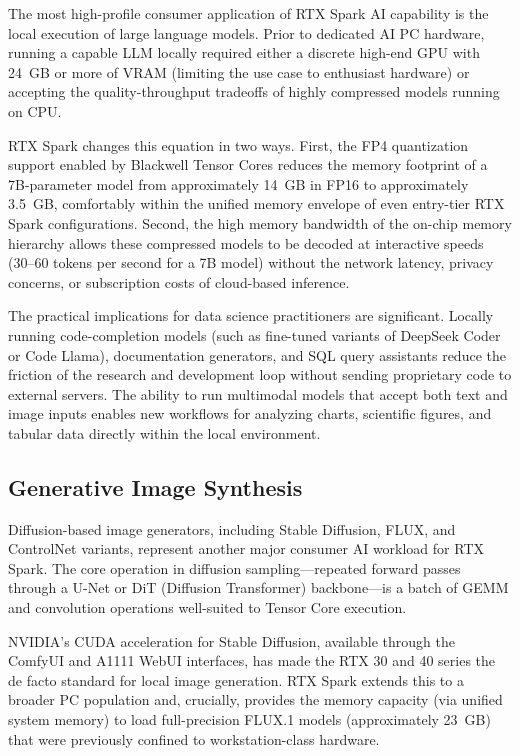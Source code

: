 \documentclass[conference]{IEEEtran}
\begin{document}
The most high-profile consumer application of RTX Spark AI capability is the local execution of large language models. Prior to dedicated AI PC hardware, running a capable LLM locally required either a discrete high-end GPU with 24~GB or more of VRAM (limiting the use case to enthusiast hardware) or accepting the quality-throughput tradeoffs of highly compressed models running on CPU.

RTX Spark changes this equation in two ways. First, the FP4 quantization support enabled by Blackwell Tensor Cores reduces the memory footprint of a 7B-parameter model from approximately 14~GB in FP16 to approximately 3.5~GB, comfortably within the unified memory envelope of even entry-tier RTX Spark configurations. Second, the high memory bandwidth of the on-chip memory hierarchy allows these compressed models to be decoded at interactive speeds (30--60 tokens per second for a 7B model) without the network latency, privacy concerns, or subscription costs of cloud-based inference.

The practical implications for data science practitioners are significant. Locally running code-completion models (such as fine-tuned variants of DeepSeek Coder or Code Llama), documentation generators, and SQL query assistants reduce the friction of the research and development loop without sending proprietary code to external servers. The ability to run multimodal models that accept both text and image inputs enables new workflows for analyzing charts, scientific figures, and tabular data directly within the local environment.

\subsection{Generative Image Synthesis}

Diffusion-based image generators, including Stable Diffusion, FLUX, and ControlNet variants, represent another major consumer AI workload for RTX Spark. The core operation in diffusion sampling---repeated forward passes through a U-Net or DiT (Diffusion Transformer) backbone---is a batch of GEMM and convolution operations well-suited to Tensor Core execution.

NVIDIA's CUDA acceleration for Stable Diffusion, available through the ComfyUI and A1111 WebUI interfaces, has made the RTX 30 and 40 series the de facto standard for local image generation. RTX Spark extends this to a broader PC population and, crucially, provides the memory capacity (via unified system memory) to load full-precision FLUX.1 models (approximately 23~GB) that were previously confined to workstation-class hardware.
\end{document}
